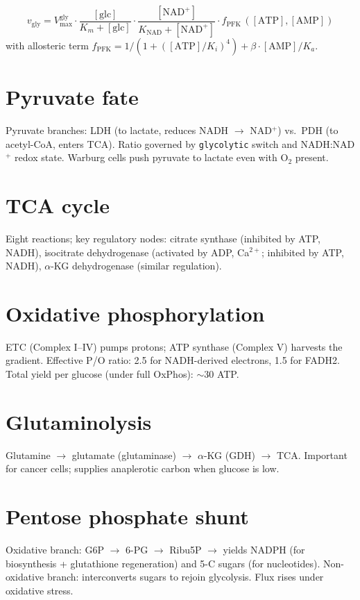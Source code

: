 \documentclass[11pt,letterpaper,twoside,openany]{book}
\newcommand{\code}[1]{\texttt{#1}}
\begin{document}
\begin{equation}
  v_{\text{gly}} = V_{\max}^{\text{gly}}\cdot\frac{[\text{glc}]}{K_m + [\text{glc}]}\cdot\frac{[\text{NAD}^+]}{K_{\text{NAD}} + [\text{NAD}^+]}\cdot f_{\text{PFK}}\,([\text{ATP}],[\text{AMP}])
\end{equation}
with allosteric term
\(f_{\text{PFK}} = 1 / (1 + ([\text{ATP}]/K_i)^4) + \beta \cdot [\text{AMP}]/K_a\).

\section{Pyruvate fate}

Pyruvate branches: LDH (to lactate, reduces NADH $\to$ NAD$^+$) vs.\
PDH (to acetyl-CoA, enters TCA). Ratio governed by
\code{glycolytic} switch and NADH:NAD$^+$ redox state. Warburg cells
push pyruvate to lactate even with O$_2$ present.

\section{TCA cycle}

Eight reactions; key regulatory nodes: citrate synthase (inhibited
by ATP, NADH), isocitrate dehydrogenase (activated by ADP, Ca$^{2+}$;
inhibited by ATP, NADH), $\alpha$-KG dehydrogenase (similar
regulation).

\section{Oxidative phosphorylation}

ETC (Complex I--IV) pumps protons; ATP synthase (Complex V) harvests
the gradient. Effective P/O ratio: 2.5 for NADH-derived electrons,
1.5 for FADH2. Total yield per glucose (under full OxPhos):
$\sim$30 ATP.

\section{Glutaminolysis}

Glutamine $\to$ glutamate (glutaminase) $\to$ $\alpha$-KG (GDH) $\to$
TCA. Important for cancer cells; supplies anaplerotic carbon when
glucose is low.

\section{Pentose phosphate shunt}

Oxidative branch: G6P $\to$ 6-PG $\to$ Ribu5P $\to$ yields NADPH (for
biosynthesis + glutathione regeneration) and 5-C sugars (for
nucleotides). Non-oxidative branch: interconverts sugars to rejoin
glycolysis. Flux rises under oxidative stress.
\end{document}
